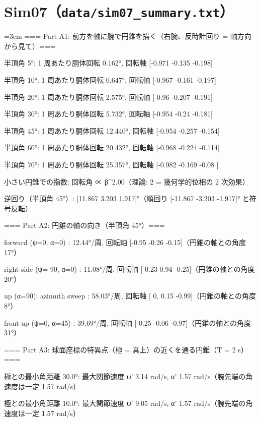 \section{Sim07（\texttt{data/sim07\_summary.txt}）}
{\footnotesize\raggedright\sloppy\setlength{\parindent}{0pt}\setlength{\parskip}{0pt}\emergencystretch=3em
=== Part A1: 前方を軸に腕で円錐を描く（右腕、反時計回り = 軸方向から見て）===\par
  半頂角   5°: 1 周あたり胴体回転   0.162°, 回転軸 [-0.971 -0.135 -0.198]\par
  半頂角  10°: 1 周あたり胴体回転   0.647°, 回転軸 [-0.967 -0.161 -0.197]\par
  半頂角  20°: 1 周あたり胴体回転   2.575°, 回転軸 [-0.96  -0.207 -0.191]\par
  半頂角  30°: 1 周あたり胴体回転   5.732°, 回転軸 [-0.954 -0.24  -0.181]\par
  半頂角  45°: 1 周あたり胴体回転  12.440°, 回転軸 [-0.954 -0.257 -0.154]\par
  半頂角  60°: 1 周あたり胴体回転  20.432°, 回転軸 [-0.968 -0.224 -0.114]\par
  半頂角  70°: 1 周あたり胴体回転  25.357°, 回転軸 [-0.982 -0.169 -0.08 ]\par
  小さい円錐での指数: 回転角 ∝ β\^{}2.00（理論: 2 = 幾何学的位相の 2 次効果）\par
  逆回り（半頂角 45°）: [11.867  3.203  1.917]°（順回り [-11.867  -3.203  -1.917]° と符号反転）\par
\mbox{}\par
=== Part A2: 円錐の軸の向き（半頂角 45°）===\par
  forward (ψ=0, α=0)        :  12.44°/周, 回転軸 [-0.95 -0.26 -0.15]（円錐の軸との角度 17°）\par
  right side (ψ=-90, α=0)   :  11.08°/周, 回転軸 [-0.23  0.94 -0.25]（円錐の軸との角度 20°）\par
  up (α=90): azimuth sweep  :  58.03°/周, 回転軸 [ 0.    0.15 -0.99]（円錐の軸との角度 8°）\par
  front-up (ψ=0, α=45)      :  39.69°/周, 回転軸 [-0.25 -0.06 -0.97]（円錐の軸との角度 31°）\par
\mbox{}\par
=== Part A3: 球面座標の特異点（極 = 真上）の近くを通る円錐（T = 2 s）===\par
  極との最小角距離  30.0°: 最大関節速度 ψ'     3.14 rad/s, α' 1.57 rad/s（腕先端の角速度は一定 1.57 rad/s）\par
  極との最小角距離  10.0°: 最大関節速度 ψ'     9.05 rad/s, α' 1.57 rad/s（腕先端の角速度は一定 1.57 rad/s）\par
}
